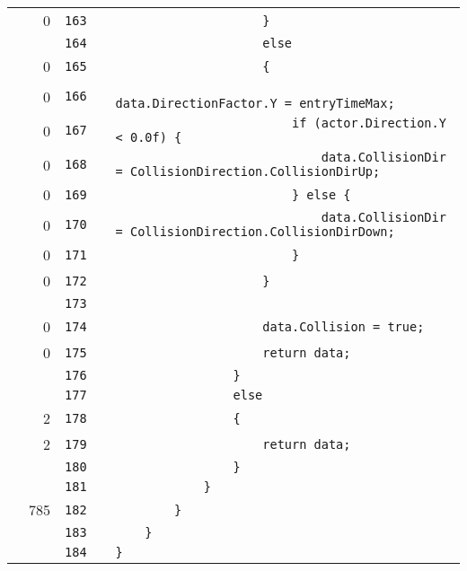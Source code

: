 \documentclass[a4paper,landscape,10pt]{article}
\begin{document}
\begin{longtable}[l]{lrrll}
\cellcolor{red} & 0 & \verb~163~ & & \verb~                    }~\\
\cellcolor{gray} &  & \verb~164~ & & \verb~                    else~\\
\cellcolor{red} & 0 & \verb~165~ & & \verb~                    {~\\
\cellcolor{red} & 0 & \verb~166~ & & \verb~                        data.DirectionFactor.Y = entryTimeMax;~\\
\cellcolor{red} & 0 & \verb~167~ & & \verb~                        if (actor.Direction.Y < 0.0f) {~\\
\cellcolor{red} & 0 & \verb~168~ & & \verb~                            data.CollisionDir = CollisionDirection.CollisionDirUp;~\\
\cellcolor{red} & 0 & \verb~169~ & & \verb~                        } else {~\\
\cellcolor{red} & 0 & \verb~170~ & & \verb~                            data.CollisionDir = CollisionDirection.CollisionDirDown;~\\
\cellcolor{red} & 0 & \verb~171~ & & \verb~                        }~\\
\cellcolor{red} & 0 & \verb~172~ & & \verb~                    }~\\
\cellcolor{gray} &  & \verb~173~ & & \verb~~\\
\cellcolor{red} & 0 & \verb~174~ & & \verb~                    data.Collision = true;~\\
\cellcolor{red} & 0 & \verb~175~ & & \verb~                    return data;~\\
\cellcolor{gray} &  & \verb~176~ & & \verb~                }~\\
\cellcolor{gray} &  & \verb~177~ & & \verb~                else~\\
\cellcolor{green} & 2 & \verb~178~ & & \verb~                {~\\
\cellcolor{green} & 2 & \verb~179~ & & \verb~                    return data;~\\
\cellcolor{gray} &  & \verb~180~ & & \verb~                }~\\
\cellcolor{gray} &  & \verb~181~ & & \verb~            }~\\
\cellcolor{green} & 785 & \verb~182~ & & \verb~        }~\\
\cellcolor{gray} &  & \verb~183~ & & \verb~    }~\\
\cellcolor{gray} &  & \verb~184~ & & \verb~}~\\
\end{longtable}
\newpage
\end{document}
